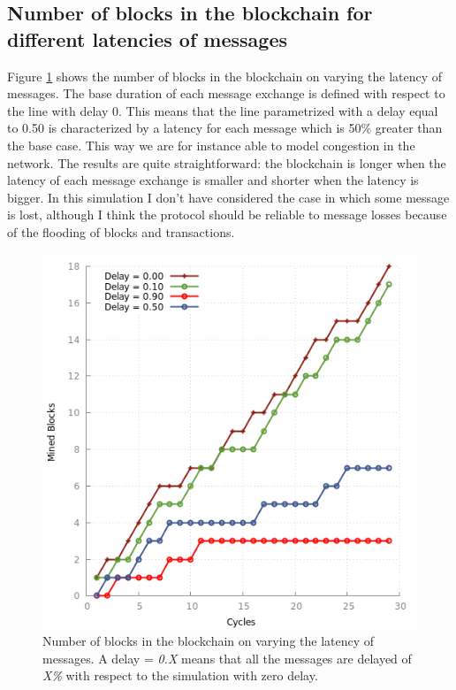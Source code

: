 \documentclass{article}
\begin{document}
\subsection{Number of blocks in the blockchain for different latencies of messages}
Figure \ref{fig:bwd} shows the number of blocks in the blockchain on varying the latency of messages. The base duration of each message exchange is defined with respect to the line with delay 0. This means that the line parametrized with a delay equal to 0.50 is characterized by a latency for each message which is 50\% greater than the base case. This way we are for instance able to model congestion in the network. The results are quite straightforward: the blockchain is longer when the latency of each message exchange is smaller and shorter when the latency is bigger. In this simulation I don't have considered the case in which some message is lost, although I think the protocol should be reliable to message losses because of the flooding of blocks and transactions.

\begin{figure}
\centerline{\includegraphics[scale=0.50]{plots/blocks_with_delay}}
\caption{Number of blocks in the blockchain on varying the latency of messages. A delay = \textit{0.X} means that all the messages are delayed of \textit{X\%} with respect to the simulation with zero delay. }
\label{fig:bwd}
\end{figure}
\end{document}
